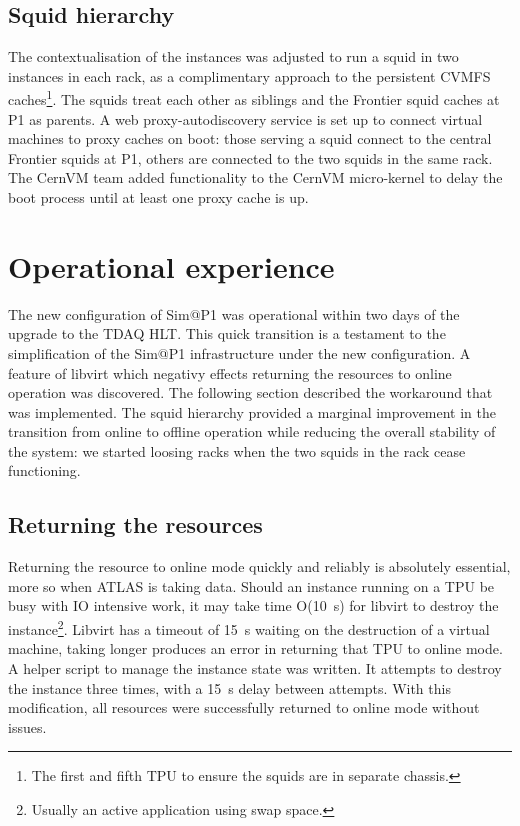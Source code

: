 \documentclass{webofc}
\begin{document}
\subsection{Squid hierarchy}
\label{sec:hierarchy}
The contextualisation of the instances was adjusted to run a squid in two
instances in each rack, as a complimentary approach to the persistent CVMFS
caches\footnote{The first and fifth TPU to ensure the squids are in
separate chassis.}. The squids treat each other as siblings and the Frontier
squid caches at P1 as parents. A web proxy-autodiscovery service is set up to
connect virtual machines to proxy caches on boot: those serving a squid
connect to the central Frontier squids at P1, others are connected to the two
squids in the same rack. The CernVM team added functionality to the CernVM
micro-kernel to delay the boot process until at least one proxy cache is up.


\section{Operational experience}
\label{sec:ops}
The new configuration of Sim@P1 was operational within two days of the upgrade
to the TDAQ HLT. This quick transition is a testament to the simplification of
the Sim@P1 infrastructure under the new configuration. A feature of libvirt
which negativy effects returning the resources to online operation was
discovered. The following section described the workaround that was implemented.
The squid hierarchy provided a marginal improvement in the transition from
online to offline operation while reducing the overall stability of the system:
we started loosing racks when the two squids in the rack cease functioning.

\subsection{Returning the resources}
\label{sec:return}
Returning the resource to online mode quickly and reliably is absolutely
essential, more so when ATLAS is taking data. Should an instance running on a
TPU be busy with IO intensive work, it may take time O(10~\textrm{s}) for
libvirt to destroy the instance\footnote{Usually an active application using
swap space.}. Libvirt has a timeout of 15~\textrm{s} waiting on the destruction
of a virtual machine, taking longer produces an error in returning that TPU to
online mode. A helper script to manage the instance state was written. It
attempts to destroy the instance three times, with a 15~\textrm{s} delay between
attempts. With this modification, all resources were successfully returned to
online mode without issues.
\end{document}
